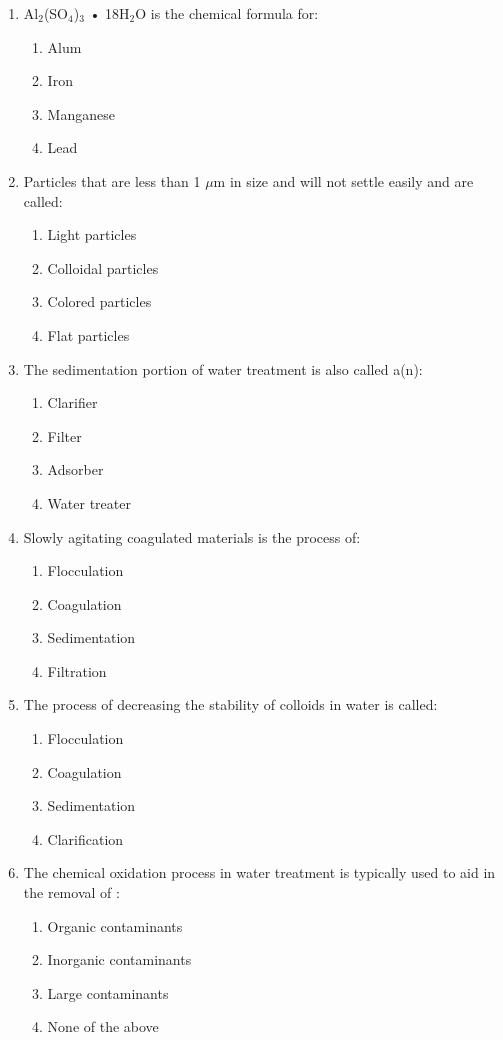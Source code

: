 \documentclass[10pt]{article}
\begin{document}
\begin{enumerate}
\begin{enumerate}
\item Al$_2$(SO$_4$)$_3$ • 18H$_2$O is the chemical formula for:
\begin{enumerate}
\item Alum
\item Iron
\item Manganese
\item Lead
\end{enumerate}

\item Particles that are less than 1 $\mu$m in size and will not settle easily and are called:
\begin{enumerate}
\item Light particles
\item Colloidal particles
\item Colored particles
\item Flat particles
\end{enumerate}

\item The sedimentation portion of water treatment is also called a(n):
\begin{enumerate}
\item Clarifier
\item Filter
\item Adsorber
\item Water treater
\end{enumerate}

\item Slowly agitating coagulated materials is the process of:
\begin{enumerate}
\item Flocculation
\item Coagulation
\item Sedimentation
\item Filtration
\end{enumerate}

\item The process of decreasing the stability of colloids in water is called:
\begin{enumerate}
\item Flocculation
\item Coagulation
\item Sedimentation
\item Clarification
\end{enumerate}

\item The chemical oxidation process in water treatment is typically used to aid in the
removal of :
\begin{enumerate}
\item Organic contaminants
\item Inorganic contaminants
\item Large contaminants
\item None of the above
\end{enumerate}


\end{enumerate}
\end{enumerate}
\end{document}
